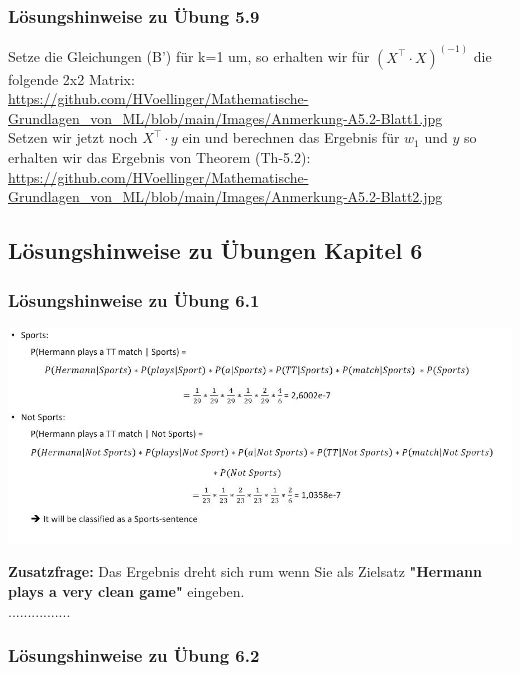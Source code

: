 \documentclass[12pt]{article}
\begin{document}
\subsubsection{Lösungshinweise zu Übung 5.9}
%
Setze die Gleichungen (B') für k=1 um, so erhalten wir für $(X^\top \cdot X)^{(-1)}$ die folgende 2x2 Matrix:\\
\url{https://github.com/HVoellinger/Mathematische-Grundlagen_von_ML/blob/main/Images/Anmerkung-A5.2-Blatt1.jpg}  \\
Setzen wir jetzt noch $X^\top \cdot y $ ein und berechnen das Ergebnis für $w_1$ und $y$ so erhalten wir das Ergebnis von Theorem (Th-5.2):\\
\url{https://github.com/HVoellinger/Mathematische-Grundlagen_von_ML/blob/main/Images/Anmerkung-A5.2-Blatt2.jpg}

\newpage

\subsection{Lösungshinweise zu Übungen Kapitel 6}

\subsubsection{Lösungshinweise zu Übung 6.1}

\begin{center} 
\includegraphics[width=1.1\textwidth]{Naive-Bayes-Ueb61_Hinweis}
\end{center}
\textbf{Zusatzfrage:} Das Ergebnis dreht sich rum wenn Sie als Zielsatz \textbf{"Hermann plays a very clean game"} eingeben.\\................

\subsubsection{Lösungshinweise zu Übung 6.2}
\end{document}
